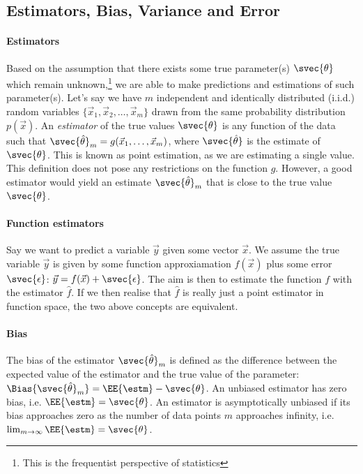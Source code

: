 
        

    \subsection{Estimators, Bias, Variance and Error}

        \paragraph{Estimators} 
        Based on the assumption that there exists some true parameter(s) $\svec{\theta}$ which remain unknown,\footnote{This is the frequentist perspective of statistics} we are able to make predictions and estimations of such parameter(s). Let's say we have $m$ independent and identically distributed (i.i.d.) random variables $\{\vec{x}_1, \vec{x}_2, \dots, \vec{x}_m\}$ drawn from the same probability distribution $p(\vec{x})$. An \textit{estimator} of the true values $\svec{\theta}$ is any function of the data such that $\svec{\hat{\theta}}_m = g(\vec{x}_1,\dots,\vec{x}_m)$, where $\svec{\hat{\theta}}$ is the estimate of $\svec{\theta}$. This is known as point estimation, as we are estimating a single value. This definition does not pose any restrictions on the function $g$. However, a good estimator would yield an estimate $\svec{\hat{\theta}}_m$ that is close to the true value $\svec{\theta}$. 
        \paragraph{Function estimators}
        Say we want to predict a variable $\vec{y}$ given some vector $\vec{x}$. We assume the true variable $\vec{y}$ is given by some function approxiamation $f(\vec{x})$ plus some error $\svec{\epsilon}$: $\vec{y} = f(\vec{x}) + \svec{\epsilon}$. The aim is then to estimate the function $f$ with the estimator $\hat{f}$. If we then realise that $\hat{f}$ is really just a point estimator in function space, the two above concepts are equivalent.

        \paragraph{Bias}
        The bias of the estimator $\svec{\hat{\theta}}_m$ is defined as the difference between the expected value of the estimator and the true value of the parameter: $\Bias{\svec{\hat{\theta}}_m} = \EE{\estm} - \svec{\theta}$. An unbiased estimator has zero bias, i.e. $\EE{\estm} = \svec{\theta}$. An estimator is asymptotically unbiased if its bias approaches zero as the number of data points $m$ approaches infinity, i.e. $\lim_{m\to\infty} \EE{\estm} = \svec{\theta}$.

